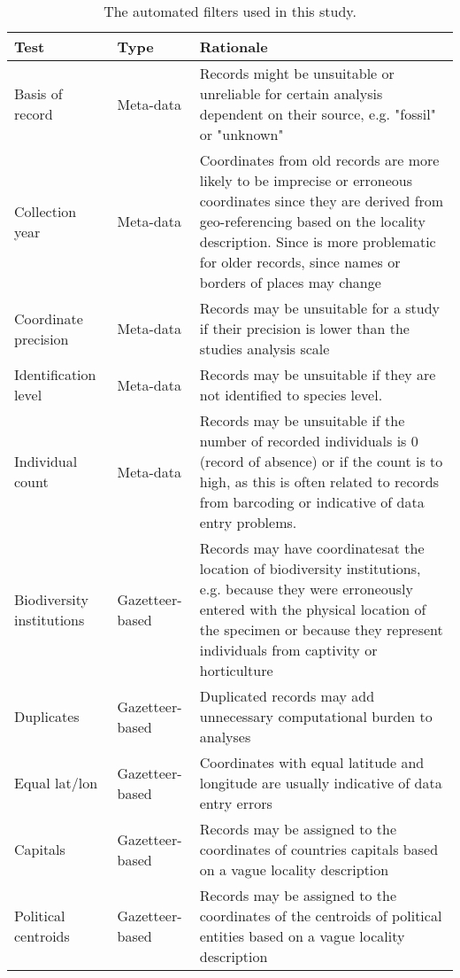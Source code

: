 \documentclass[
  12pt,
]{article}
\begin{document}
\begin{table}[!h]

\caption{\label{tab:tabletests}The automated filters used in this study.}
\centering
\fontsize{9}{11}\selectfont
\begin{tabular}[t]{>{\raggedright\arraybackslash}p{2cm}>{\raggedright\arraybackslash}p{2.5cm}>{\raggedright\arraybackslash}p{10cm}}
\toprule
Test & Type & Rationale\\
\midrule
\rowcolor{gray!6}  Basis of record & Meta-data & Records might be unsuitable or unreliable for certain analysis dependent on their source, e.g. "fossil" or "unknown"\\
Collection year & Meta-data & Coordinates from old records are more likely to be imprecise or erroneous coordinates since they are derived from  geo-referencing based on the locality description. Since is more problematic for older records, since names or borders of places may change\\
\rowcolor{gray!6}  Coordinate precision & Meta-data & Records may be unsuitable for a study if their precision is lower than the studies analysis scale\\
Identification level & Meta-data & Records may be unsuitable if they are not identified to species level.\\
\rowcolor{gray!6}  Individual count & Meta-data & Records may be unsuitable if the number of recorded individuals is 0 (record of absence) or if the count is to high, as this is often related to records from barcoding or indicative of data entry problems.\\
\addlinespace
Biodiversity institutions & Gazetteer-based & Records may have coordinatesat the location of biodiversity institutions, e.g. because they were erroneously entered with the physical location of the specimen or because they represent individuals from captivity or horticulture\\
\rowcolor{gray!6}  Duplicates & Gazetteer-based & Duplicated records may add unnecessary computational burden to analyses\\
Equal lat/lon & Gazetteer-based & Coordinates with equal latitude and longitude are usually indicative of data entry errors\\
\rowcolor{gray!6}  Capitals & Gazetteer-based & Records may be assigned to the coordinates of countries capitals based on a vague locality description\\
Political centroids & Gazetteer-based & Records may be assigned to the coordinates of the centroids of political entities based on a vague locality description\\

\end{tabular}
\end{table}
\end{document}
